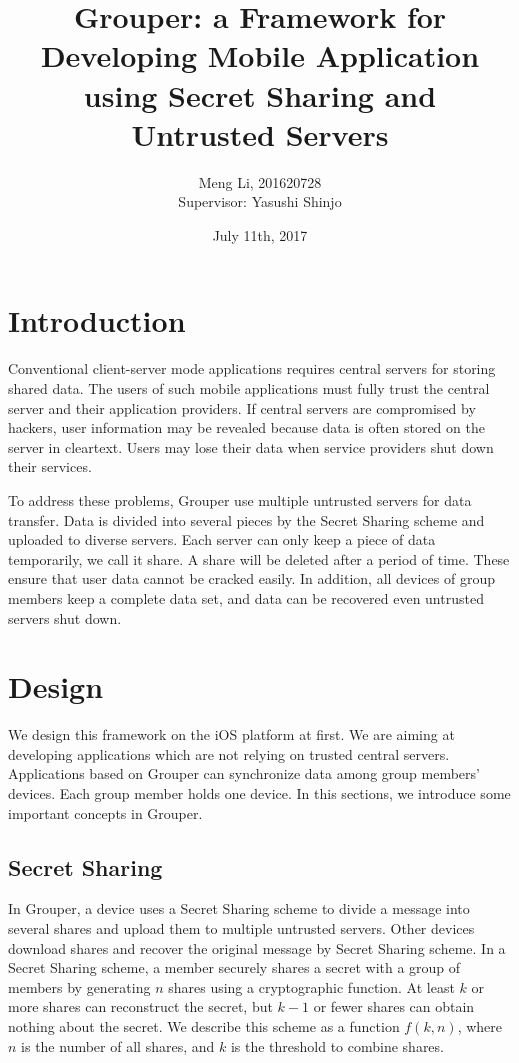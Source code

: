 \documentclass[twocolumn,10pt]{article}
\begin{document}
\small
\date{July 11th, 2017}

\title{\bf Grouper: a Framework for Developing Mobile Application using Secret Sharing and Untrusted Servers}

\author{
	Meng Li, 201620728  
	\\ Supervisor: Yasushi Shinjo
}

\maketitle

\section{Introduction}
Conventional client-server mode applications requires central servers for storing shared data. The users of such mobile applications must fully trust the central server and their application providers. If central servers are compromised by hackers, user information may be revealed because data is often stored on the server in cleartext. Users may lose their data when service providers shut down their services. 

To address these problems, Grouper use multiple untrusted servers for data transfer. Data is divided into several pieces by the Secret Sharing scheme and uploaded to diverse servers. Each server can only keep a piece of data temporarily, we call it share. A share will be deleted after a period of time. These ensure that user data cannot be cracked easily. In addition, all devices of group members keep a complete data set, and data can be recovered even untrusted servers shut down.

\section{Design}
We design this framework on the iOS platform at first. We are aiming at developing applications which are not relying on trusted central servers. Applications based on Grouper can synchronize data among group members' devices. Each group member holds one device. In this sections, we introduce some important concepts in Grouper.

\subsection{Secret Sharing}
In Grouper, a device uses a Secret Sharing scheme to divide a message into several shares and upload them to multiple untrusted servers. Other devices download shares and recover the original message by Secret Sharing scheme. In a Secret Sharing scheme, a member securely shares a secret with a group of members by generating $n$ shares using a cryptographic function\cite{smith2013layered}. At least $k$ or more shares can reconstruct the secret, but $k-1$ or fewer shares can obtain nothing about the secret\cite{pang2005new}. We describe this scheme as a function $f(k, n)$, where $n$ is the number of all shares, and $k$ is the threshold to combine shares. 
\end{document}
